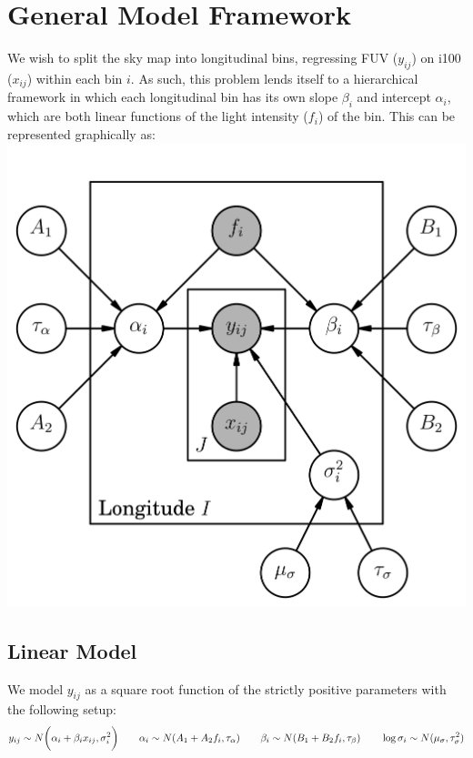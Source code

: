 \documentclass[12pt]{article}
\begin{document}

\def\ci{\perp\!\!\!\perp}
\def\ex{\mathbb{E}}
\def\prob{\mathbb{P}}
\def\ind{\mathbb{I}}
\def\grad{\triangledown}
\def\bigo{\mathcal{O}}

\section{General Model Framework}
We wish to split the sky map into longitudinal bins, regressing FUV ($y_{ij}$) on i100 ($x_{ij}$) within each bin $i$. As such, this problem lends itself to a hierarchical framework in which each longitudinal bin has its own slope $\beta_i$ and intercept $\alpha_i$, which are both linear functions of the light intensity ($f_i$) of the bin. This can be represented graphically as:\\

\indent\indent\indent\indent\indent\indent\indent\indent \includegraphics{LightIntensity_Model.png}

\subsection{Linear Model}
We model $y_{ij}$ as a square root function of the strictly positive parameters with the following setup:
$$y_{ij} \sim N \biggl( \alpha_i + \beta_i x_{ij} , \sigma_i^2 \biggr)
\hspace{20 pt} \alpha_i \sim N(A_1 + A_2 f_i, \tau_\alpha)
\hspace{20 pt} \beta_i \sim N(B_1 + B_2 f_i, \tau_\beta)
\hspace{20 pt} \log\sigma_i \sim N(\mu_\sigma,\tau_\sigma^2)$$
\end{document}
